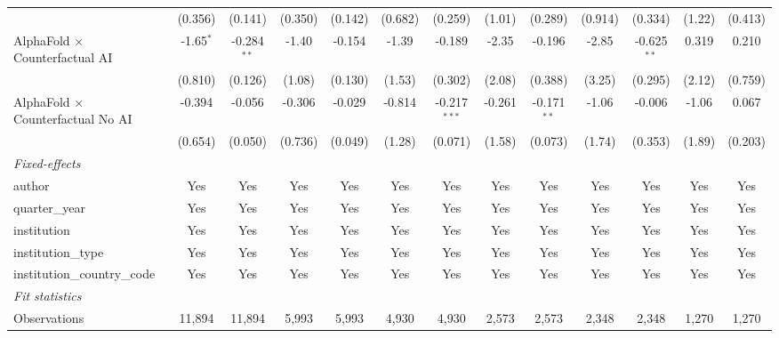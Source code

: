 \begin{tabular}{lcccccccccccc}
                                            & (0.356)     & (0.141)       & (0.350) & (0.142) & (0.682) & (0.259)        & (1.01)  & (0.289)       & (0.914) & (0.334)       & (1.22) & (0.413)\\   
   AlphaFold $\times$ Counterfactual AI     & -1.65$^{*}$ & -0.284$^{**}$ & -1.40   & -0.154  & -1.39   & -0.189         & -2.35   & -0.196        & -2.85   & -0.625$^{**}$ & 0.319  & 0.210\\   
                                            & (0.810)     & (0.126)       & (1.08)  & (0.130) & (1.53)  & (0.302)        & (2.08)  & (0.388)       & (3.25)  & (0.295)       & (2.12) & (0.759)\\   
   AlphaFold $\times$ Counterfactual No AI  & -0.394      & -0.056        & -0.306  & -0.029  & -0.814  & -0.217$^{***}$ & -0.261  & -0.171$^{**}$ & -1.06   & -0.006        & -1.06  & 0.067\\   
                                            & (0.654)     & (0.050)       & (0.736) & (0.049) & (1.28)  & (0.071)        & (1.58)  & (0.073)       & (1.74)  & (0.353)       & (1.89) & (0.203)\\   
   \midrule
   \emph{Fixed-effects}\\
   author                                   & Yes         & Yes           & Yes     & Yes     & Yes     & Yes            & Yes     & Yes           & Yes     & Yes           & Yes    & Yes\\  
   quarter\_year                            & Yes         & Yes           & Yes     & Yes     & Yes     & Yes            & Yes     & Yes           & Yes     & Yes           & Yes    & Yes\\  
   institution                              & Yes         & Yes           & Yes     & Yes     & Yes     & Yes            & Yes     & Yes           & Yes     & Yes           & Yes    & Yes\\  
   institution\_type                        & Yes         & Yes           & Yes     & Yes     & Yes     & Yes            & Yes     & Yes           & Yes     & Yes           & Yes    & Yes\\  
   institution\_country\_code               & Yes         & Yes           & Yes     & Yes     & Yes     & Yes            & Yes     & Yes           & Yes     & Yes           & Yes    & Yes\\  
   \midrule
   \emph{Fit statistics}\\
   Observations                             & 11,894      & 11,894        & 5,993   & 5,993   & 4,930   & 4,930          & 2,573   & 2,573         & 2,348   & 2,348         & 1,270  & 1,270\\  

\end{tabular}
